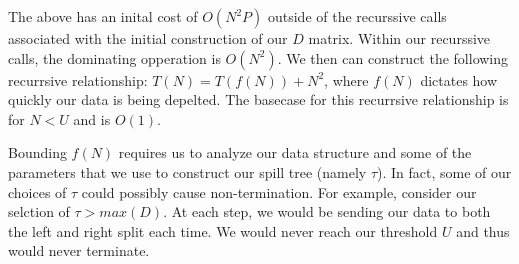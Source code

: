 \vspace{5 mm}
\noindent
The above has an inital cost of $O(N^{2} P)$ outside of the recurssive calls 
associated with the initial construction of our $D$ matrix. Within our 
recurssive calls, the dominating opperation is $O(N^{2})$. We then can 
construct the following recurrsive relationship: $T(N) = T(f(N)) + N^{2}$, 
where $f(N)$ dictates how quickly our data is being depelted. The basecase for 
this recurrsive relationship is for $N < U$ and is $O(1)$.

\vspace{5 mm}
\noindent
Bounding $f(N)$ requires us to analyze our data structure and some of the 
parameters that we use to construct our spill tree (namely $\tau$). In fact, 
some of our choices of $\tau$ could possibly cause non-termination. For 
example, consider our selction of $\tau > max(D)$. At each step, we would be 
sending our data to both the left and right split each time. We would never 
reach our threshold $U$ and thus would never terminate.
